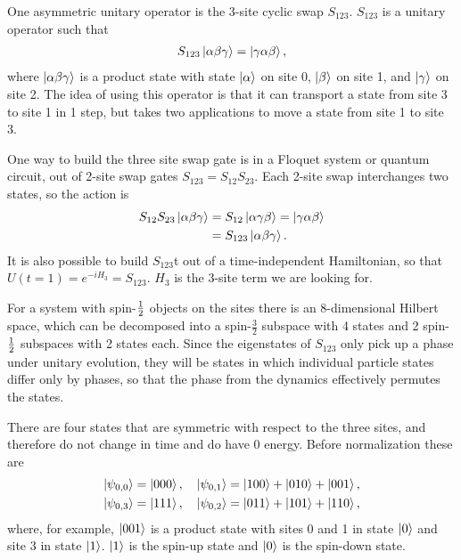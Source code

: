 One asymmetric unitary operator is the 3-site cyclic swap $S_{123}$. $S_{123}$ is a unitary operator such that
\begin{align}
S_{123}\left|\alpha\beta\gamma\right\rangle =\left|\gamma\alpha\beta\right\rangle, \label{eqn:condition}
\end{align}
where $\left|\alpha\beta\gamma\right\rangle$ is a product state with state $\left|\alpha\right\rangle$ on site 0, $\left|\beta\right\rangle$ on site 1, and $\left|\gamma\right\rangle$ on site 2. The idea of using this operator is that it can transport a state from site 3 to site 1 in 1 step, but takes two applications to move a state from site 1 to site 3.

One way to build the three site swap gate is in a Floquet system or quantum circuit, out of 2-site swap gates $S_{123} = S_{12}S_{23}$. Each 2-site swap interchanges two states, so the action is 
\begin{align}
S_{12}S_{23}\left|\alpha\beta\gamma\right\rangle &= S_{12}\left|\alpha\gamma\beta\right\rangle = 
	\left|\gamma\alpha\beta\right\rangle\nonumber\\
&= S_{123}\left|\alpha\beta\gamma\right\rangle.
\end{align}
It is also possible to build $S_{123}$t out of a time-independent Hamiltonian, so that $U(t=1) = e^{-iH_3} = S_{123}$. $H_3$ is the 3-site term we are looking for.

For a system with spin-$\frac{1}{2}$ objects on the sites there is an 8-dimensional Hilbert space, which can be decomposed into a spin-$\frac{3}{2}$ subspace with 4 states and 2 spin-$\frac{1}{2}$ subspaces with 2 states each. Since the eigenstates of $S_{123}$ only pick up a phase under unitary evolution, they will be states in which individual particle states differ only by phases, so that the phase from the dynamics effectively permutes the states. 

There are four states that are symmetric with respect to the three sites, and therefore do not change in time and do have 0 energy. Before normalization these are
\begin{align}
\left|\psi_{0,0}\right\rangle=\left|000\right\rangle,\quad \left|\psi_{0,1}\right\rangle=\left|100\right\rangle+\left|010\right\rangle+\left|001\right\rangle,
	\nonumber\\
\left|\psi_{0,3}\right\rangle=\left|111\right\rangle,\quad \left|\psi_{0,2}\right\rangle=\left|011\right\rangle+\left|101\right\rangle+\left|110\right\rangle,
	\label{eqn:zero}
\end{align}
where, for example, $\left|001\right\rangle$ is a product state with sites 0 and 1 in state $\left|0\right\rangle$ and site 3 in state $\left|1\right\rangle$. $\left|1\right\rangle$ is the spin-up state and $\left|0\right\rangle$ is the spin-down state.

